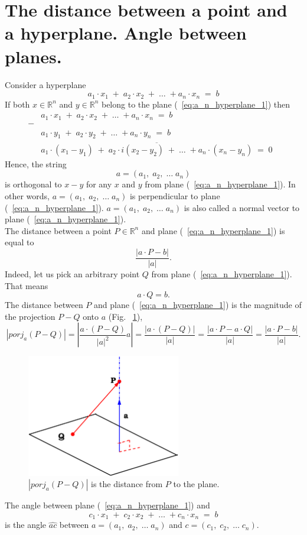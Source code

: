\documentclass[color=black,11pt]{elegantpaper}
\begin{document}
\section{The distance between a point and a hyperplane. Angle between planes.}
Consider a hyperplane
\begin{equation}
\label{eq:a_n_hyperplane_1}
a_1 \cdot x_1 \; + \; a_2 \cdot x_2 \; + \;\dots \;+ a_n\cdot x_n \;= \; b
\end{equation}
If both $x\in \mathbb{R}^n$ and $y \in \mathbb{R}^n$ belong to the plane (~\ref{eq:a_n_hyperplane_1}) then
\begin{eqnarray*}
&a_1 \cdot x_1 \; + \; a_2 \cdot x_2 \; + \;\dots \;+ a_n\cdot x_n \;= \; b&\\
-&&\\
&a_1 \cdot y_1 \; + \; a_2 \cdot y_2 \; + \;\dots \;+ a_n\cdot y_n \;= \; b& \\
&\overline{a_1 \cdot (x_1 -y_1) \; + \; a_2 \cdot i(x_2- y_2) \; + \;\dots \;+ a_n\cdot (x_n - y_n) \;= \; 0}& 
\end{eqnarray*}
Hence, the string 
$$
a = (a_1,\;a_2,\; \dots\;a_n)
$$
is orthogonal to $x-y$ for any $x$ and $y$ from plane (~\ref{eq:a_n_hyperplane_1}). In other words, $a= (a_1,\;a_2,\; \dots\;a_n)$ is perpendicular to plane (~\ref{eq:a_n_hyperplane_1}). $a= (a_1,\;a_2,\; \dots\;a_n)$ is also called a normal vector to plane (~\ref{eq:a_n_hyperplane_1}).\\
The distance between a point $P\in \mathbb{R}^n$ and plane (~\ref{eq:a_n_hyperplane_1}) is equal to
$$
\frac{|a\cdot P -b |}{|a|}.
$$
Indeed, let us pick an arbitrary point $Q$ from plane (~\ref{eq:a_n_hyperplane_1}). That means
$$
a\cdot Q = b.
$$
The distance between $P$ and plane (~\ref{eq:a_n_hyperplane_1}) is the magnitude of the projection $P-Q$ onto $a$ (Fig. ~\ref{fig:distance_point_plane}), 
$$
|porj_{a}(P-Q)| = |\frac{a\cdot (P-Q)}{|a|^2} a |= \frac{|a\cdot (P-Q)|}{|a|}=\frac{|a\cdot P-a\cdot Q|}{|a|} =\frac{|a\cdot P -b |}{|a|}. 
$$
\begin{figure}[htbp]
  \centering
  \includegraphics[width=0.6\textwidth]{xfig_stuff/distance_point_plane.fi.eps}
  \caption{$|porj_{a}(P-Q)| $ is the distance from $P$ to the plane.}
  \label{fig:distance_point_plane}
\end{figure}
The angle between plane (~\ref{eq:a_n_hyperplane_1}) and
$$
c_1 \cdot x_1 \; + \; c_2 \cdot x_2 \; + \;\dots \;+ c_n\cdot x_n \;= \; b
$$
is the angle $\hat{ac}$ between $a = (a_1,\;a_2,\; \dots\;a_n)$ and $c=(c_1,\;c_2,\;\dots\; c_n).$
\end{document}
